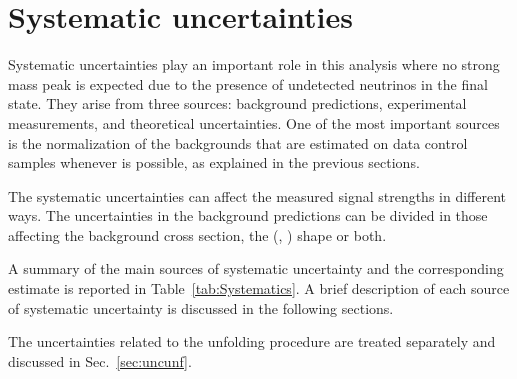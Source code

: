 \section{Systematic uncertainties}\label{sec:Systematics}

Systematic uncertainties play an important role in this analysis where
no strong mass peak is expected due to the presence of undetected
neutrinos in the final state. They arise from three sources: background predictions, experimental measurements, and theoretical uncertainties. One of the most important sources is the normalization of the backgrounds that are estimated on data control samples whenever is possible, as explained in the previous sections.

The systematic uncertainties can affect the measured signal strengths in different ways. The uncertainties in the background predictions can be divided in those affecting the background cross section, the (\mll, \mt) shape or both. %

A summary of the main sources of systematic uncertainty and the corresponding estimate is reported in Table~\ref{tab:Systematics}. A brief description of each source of systematic uncertainty is discussed in the following sections.

The uncertainties related to the unfolding procedure are treated separately and discussed in Sec.~\ref{sec:uncunf}.

